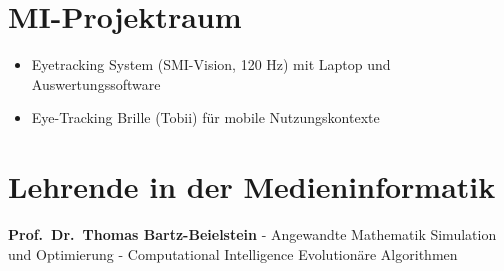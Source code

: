 \section{MI-Projektraum}\label{mi-projektraum}

\begin{itemize}
\tightlist
\item
  Eyetracking System (SMI-Vision, 120 Hz) mit Laptop und
  Auswertungssoftware
\item
  Eye-Tracking Brille (Tobii) für mobile Nutzungskontexte
\end{itemize}

\section{Lehrende in der
Medieninformatik}\label{lehrende-in-der-medieninformatik}

\textbf{Prof.~Dr.~Thomas Bartz-Beielstein} - Angewandte Mathematik
Simulation und Optimierung - Computational Intelligence Evolutionäre
Algorithmen

